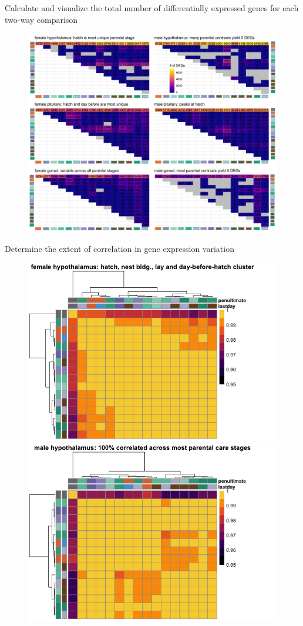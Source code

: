 \documentclass[final]{beamer}
\newlength{\onecolwid}
\newlength{\twocolwid}
\begin{document}
\begin{frame}[t]
\begin{columns}[t]
\begin{column}{\twocolwid}
\begin{columns}[t,totalwidth=\twocolwid]
\begin{column}{\onecolwid}
\begin{block}{{\normalsize Calculate and visualize  the total number of differentially expressed genes for each two-way comparison}}

\begin{figure}
\includegraphics[width=1\linewidth]{DoveParentsRNAseq_totalDEGs.png}
\end{figure}

\end{block}

\begin{block}{{\normalsize Determine the extent of correlation in gene expression variation}}


\begin{figure}
\includegraphics[width=0.5\linewidth]{correlationheatmaps-1.png}
\includegraphics[width=0.5\linewidth]{correlationheatmaps-4.png}
\end{figure}


\end{block}
\end{column}
\end{columns}
\end{column}
\end{columns}
\end{frame}
\end{document}
